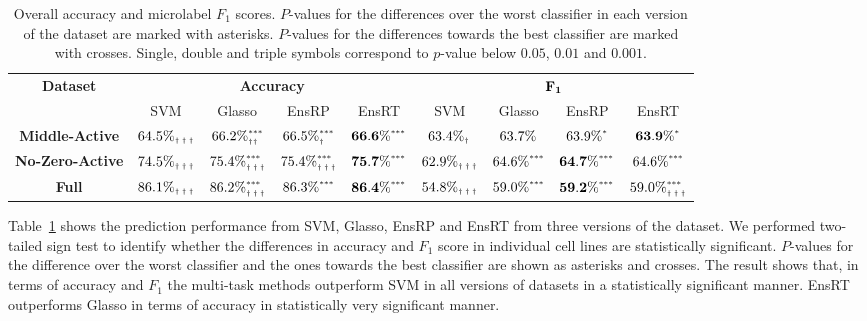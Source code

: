 \documentclass[runningheads,a4paper]{llncs}
\begin{document}
\begin{table}
\scriptsize
\centering
\begin{tabular}{|c||c|c|c|c||c|c|c|c|}
\toprule
\multirow{2}{*}{\bf Dataset}
& \multicolumn{4}{|c||}{\bf Accuracy} &  \multicolumn{4}{|c|}{\bf $\bf F_1$}\\ \cline{2-9}
& {SVM} & {Glasso} & {EnsRP} & {EnsRT} & {SVM} & {Glasso} & {EnsRP} & {EnsRT}\\
\midrule
{\bf Middle-Active} & ${64.5\%}_{\text{\tiny $\dagger\dagger\dagger$}}$ & ${66.2\%^{\text{\tiny ***}}_{\text{\tiny $\dagger\dagger$}}}$& ${66.5\%^{\text{\tiny ***}}_{\text{\tiny $\dagger$}}}$ & ${\bf 66.6\%^{\text{\tiny ***}}}$
& $63.4\%_{\text{\tiny $\dagger$}}$ & ${ 63.7\%^{\text{\tiny }}_{\text{\tiny }}}$ & ${ 63.9\%^{\text{\tiny *}}_{\text{\tiny }}}$ & ${\bf 63.9\%^{\text{\tiny *}}}$\\ \cline{1-9}

{\bf No-Zero-Active} & $74.5\%_{\text{\tiny $\dagger\dagger\dagger$}}$ & ${ 75.4\%^{\text{\tiny ***}}_{\text{\tiny $\dagger\dagger\dagger$}}}$ &${75.4\%^{\text{\tiny ***}}_{\text{\tiny $\dagger\dagger\dagger$}}}$ & ${\bf 75.7\%^{\text{\tiny ***}}}$
& $62.9\%_{\text{\tiny $\dagger\dagger\dagger$}}$ & ${64.6\%^{\text{\tiny ***}}_{\text{\tiny $$}}}$ & ${\bf 64.7\%^{\text{\tiny ***}}}$ & ${64.6\%^{\text{\tiny ***}}_{\text{\tiny $$}}}$\\ \cline{1-9}

{\bf Full} & $86.1\%_{\text{\tiny $\dagger\dagger\dagger$}}$ & ${86.2\%^{\text{\tiny ***}}_{\text{\tiny $\dagger\dagger\dagger$}}}$ & ${86.3\%^{\text{\tiny ***}}_{\text{\tiny }}}$ & ${\bf 86.4\%^{\text{\tiny ***}}}$
& $54.8\%_{\text{\tiny $\dagger\dagger\dagger$}}$ & ${ 59.0\%^{\text{\tiny ***}}_{\text{\tiny $$}}}$ & ${\bf 59.2\%^{\text{\tiny ***}}}$ & ${59.0\%^{\text{\tiny ***}}_{\text{\tiny $\dagger\dagger\dagger$}}}$\\ \cline{1-9}

\bottomrule
\end{tabular}
\caption{Overall accuracy and microlabel $F_1$ scores. $P$-values for the differences over the worst classifier in each version of the dataset are marked with asterisks. $P$-values for the differences towards the best classifier are marked with crosses. Single, double and triple symbols correspond to $p$-value below $0.05$, $0.01$ and $0.001$.}
\label{table_data_version}
\end{table}


Table~\ref{table_data_version} shows the prediction performance from SVM, Glasso, EnsRP and EnsRT from three versions of the dataset. We performed two-tailed sign test to identify whether the differences in accuracy and $F_1$ score in individual cell lines are statistically significant.
$P$-values for the difference over the worst classifier and the ones towards the best classifier are shown as asterisks and crosses. The result shows that, in terms of accuracy and $F_1$ the multi-task methods outperform SVM in all versions of datasets in a statistically significant manner. EnsRT outperforms Glasso in terms of accuracy in statistically very significant manner.
\end{document}
